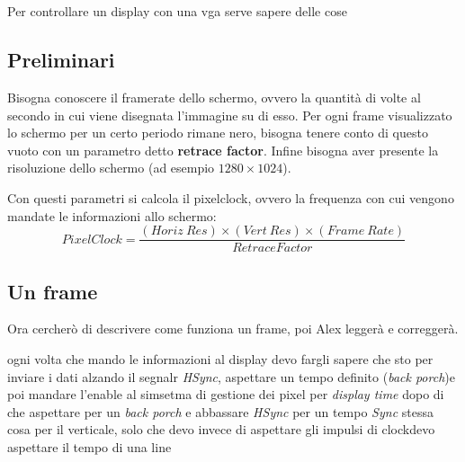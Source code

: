 \section{}
Per controllare un display con una vga serve sapere delle cose

\subsection{Preliminari}
Bisogna conoscere il framerate dello schermo, ovvero la quantit\`a di volte al secondo in cui viene disegnata l'immagine su di esso. Per ogni frame visualizzato lo schermo per un certo periodo rimane nero, bisogna tenere conto di questo vuoto con un parametro detto \textbf{retrace factor}. Infine bisogna aver presente la risoluzione dello schermo (ad esempio $1280\times1024$).

Con questi parametri si calcola il pixelclock, ovvero la frequenza con cui vengono mandate le informazioni allo schermo:
\begin{equation}\label{eq:pixelclock}
PixelClock = \frac{(Horiz\ Res) \times (Vert\ Res) \times (Frame\ Rate)}
{Retrace Factor}
\end{equation}

\subsection{Un frame}
Ora cercher\`o di descrivere come funziona un frame, poi Alex legger\`a e corregger\`a.
\begin{figure}[hbt]
	\centering
{}
\caption{}
\end{figure}
ogni volta che mando le informazioni al display devo fargli sapere che sto per inviare i dati alzando il segnalr \textit{HSync}, aspettare un tempo definito (\textit{back porch})e poi mandare l'enable al simsetma di gestione dei pixel per \textit{display time} dopo di che aspettare per un \textit{back porch} e abbassare \textit{HSync} per un tempo \textit{Sync}
stessa cosa per il verticale, solo che devo invece di aspettare gli impulsi di clockdevo aspettare il tempo di una line